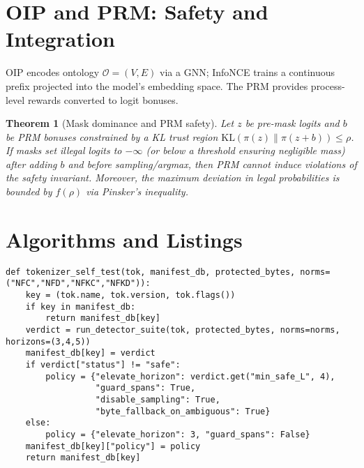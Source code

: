 \documentclass{article}
\newtheorem{theorem}{Theorem}
\begin{document}
\section{OIP and PRM: Safety and Integration}
OIP encodes ontology $\mathcal{O}=(V,E)$ via a GNN; InfoNCE trains a continuous prefix projected into the model’s embedding space. The PRM provides process-level rewards converted to logit bonuses.

\begin{theorem}[Mask dominance and PRM safety]\label{thm:prm}
Let $z$ be pre-mask logits and $b$ be PRM bonuses constrained by a KL trust region $\mathrm{KL}(\pi(z)\|\pi(z+b))\le \rho$. If masks set illegal logits to $-\infty$ (or below a threshold ensuring negligible mass) after adding $b$ and before sampling/argmax, then PRM cannot induce violations of the safety invariant. Moreover, the maximum deviation in legal probabilities is bounded by $f(\rho)$ via Pinsker’s inequality.
\end{theorem}

\section{Algorithms and Listings}
\begin{lstlisting}[style=py, caption={Tokenizer self-test and verdict cache with cross-lingual adversarial contexts.}]
def tokenizer_self_test(tok, manifest_db, protected_bytes, norms=("NFC","NFD","NFKC","NFKD")):
    key = (tok.name, tok.version, tok.flags())
    if key in manifest_db: 
        return manifest_db[key]
    verdict = run_detector_suite(tok, protected_bytes, norms=norms, horizons=(3,4,5))
    manifest_db[key] = verdict
    if verdict["status"] != "safe":
        policy = {"elevate_horizon": verdict.get("min_safe_L", 4),
                  "guard_spans": True,
                  "disable_sampling": True,
                  "byte_fallback_on_ambiguous": True}
    else:
        policy = {"elevate_horizon": 3, "guard_spans": False}
    manifest_db[key]["policy"] = policy
    return manifest_db[key]
\end{lstlisting}
\end{document}
